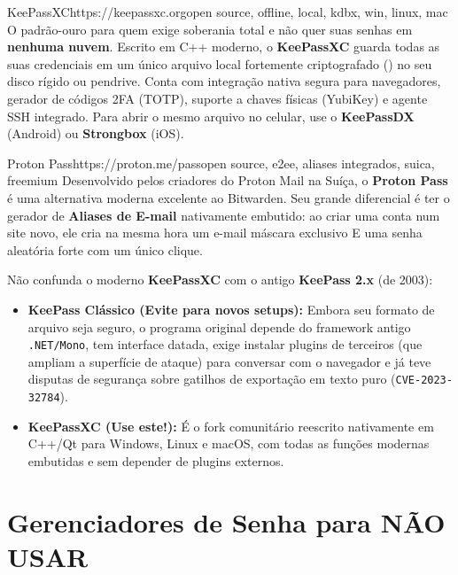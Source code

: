 \documentclass{pousadaguide}
\begin{document}
\begin{ferramenta}[goat,logo=keepassxc]{KeePassXC}{https://keepassxc.org}{open source, offline, local, kdbx, win, linux, mac}
O padrão-ouro para quem exige soberania total e não quer suas senhas em \textbf{nenhuma nuvem}. Escrito em C++ moderno, o \textbf{KeePassXC} guarda todas as suas credenciais em um único arquivo local fortemente criptografado () no seu disco rígido ou pendrive. Conta com integração nativa segura para navegadores, gerador de códigos 2FA (TOTP), suporte a chaves físicas (YubiKey) e agente SSH integrado. Para abrir o mesmo arquivo  no celular, use o \textbf{KeePassDX} (Android) ou \textbf{Strongbox} (iOS). 
\end{ferramenta}

\begin{ferramenta}[recomendado,logo=protonpass]{Proton Pass}{https://proton.me/pass}{open source, e2ee, aliases integrados, suica, freemium}
Desenvolvido pelos criadores do Proton Mail na Suíça, o \textbf{Proton Pass} é uma alternativa moderna excelente ao Bitwarden. Seu grande diferencial é ter o gerador de \textbf{Aliases de E-mail} nativamente embutido: ao criar uma conta num site novo, ele cria na mesma hora um e-mail máscara exclusivo E uma senha aleatória forte com um único clique. 
\end{ferramenta}

\begin{nota}
Não confunda o moderno \textbf{KeePassXC} com o antigo \textbf{KeePass 2.x} (de 2003):
\begin{itemize}
  \item \textbf{KeePass Clássico (Evite para novos setups):} Embora seu formato de arquivo seja seguro, o programa original depende do framework antigo \texttt{.NET/Mono}, tem interface datada, exige instalar plugins de terceiros (que ampliam a superfície de ataque) para conversar com o navegador e já teve disputas de segurança sobre gatilhos de exportação em texto puro (\texttt{CVE-2023-32784}).
  \item \textbf{KeePassXC (Use este!):} É o fork comunitário reescrito nativamente em C++/Qt para Windows, Linux e macOS, com todas as funções modernas embutidas e sem depender de plugins externos.
\end{itemize}
\end{nota}

\section{Gerenciadores de Senha para NÃO USAR}
\end{document}
